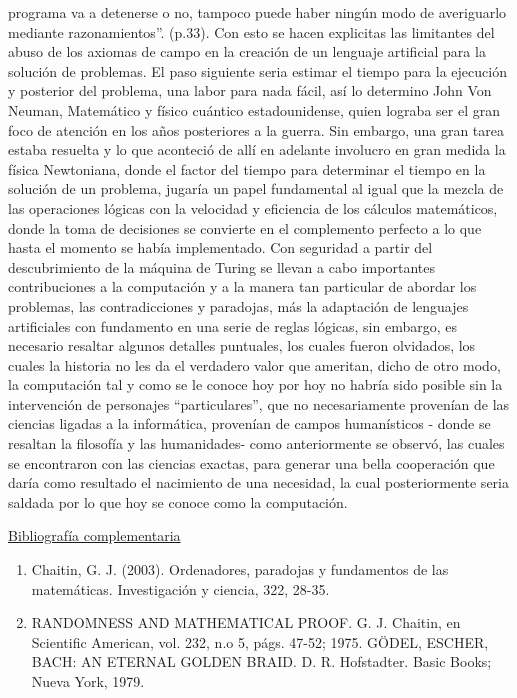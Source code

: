 \documentclass{article}
\begin{document}
programa va a detenerse o no, tampoco puede haber ningún modo de averiguarlo mediante razonamientos”. (p.33). Con esto se hacen explicitas las limitantes del abuso de los axiomas de campo en la creación de un lenguaje artificial para la solución de problemas. El paso siguiente seria estimar el tiempo para la ejecución y posterior del problema, una labor para nada fácil, así lo determino John Von Neuman, Matemático y físico cuántico estadounidense, quien lograba ser el gran foco de atención en los años posteriores a la guerra. Sin embargo, una gran tarea estaba resuelta y lo que aconteció de allí en adelante involucro en gran medida la física Newtoniana, donde el factor del tiempo para determinar el tiempo en la solución de un problema, jugaría un papel fundamental al igual que la mezcla de las operaciones lógicas con la velocidad y eficiencia de los cálculos matemáticos, donde la toma de decisiones se convierte en el complemento perfecto a lo que hasta el momento se había implementado. Con seguridad a partir del descubrimiento de la máquina de Turing se llevan a cabo importantes contribuciones a la computación y a la manera tan particular de abordar los problemas, las contradicciones y paradojas, más la adaptación de lenguajes artificiales con fundamento en una serie de reglas lógicas, sin embargo, es necesario resaltar algunos detalles puntuales, los cuales fueron olvidados, los cuales la historia no les da el verdadero valor que ameritan, dicho de otro modo, la computación tal y como se le conoce hoy por hoy no habría sido posible sin la intervención de personajes “particulares”, que no necesariamente provenían de las ciencias ligadas a la informática, provenían de campos humanísticos - donde se resaltan la filosofía y las humanidades- como anteriormente se observó, las cuales se encontraron con las ciencias exactas, para generar una bella cooperación que daría como resultado el nacimiento de una necesidad, la cual posteriormente seria saldada por lo que hoy se conoce como la computación.
\newpage






\underline{Bibliografía complementaria}
\begin{enumerate}
 \item Chaitin, G. J. (2003). Ordenadores, paradojas y fundamentos de las matemáticas. Investigación y ciencia, 322, 28-35.
 \item RANDOMNESS AND MATHEMATICAL PROOF. G. J. Chaitin,
en Scientific American, vol. 232, n.o 5, págs. 47-52; 1975.
GÖDEL, ESCHER, BACH: AN ETERNAL GOLDEN BRAID.
D. R. Hofstadter. Basic Books; Nueva York, 1979.


 \end{enumerate} 
\end{document}
